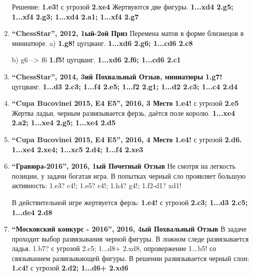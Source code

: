 \begin{enumerate}
Решение: \textbf{1.\rook{}e3!} с угрозой \textbf{2.\rook{}xe4\mate{}} Жертвуются две фигуры. \textbf{1...\rook{}xd4 2.\queen{}g5\mate{}; 1...\king{}xf4 2.\queen{}g3\mate{}; 1...\king{}xd4 2.\queen{}a1\mate{}; 1...\knight{}xf4 2.\queen{}g7\mate{}}
      
\item \textbf{ ``ChessStar'', 2012, 1ый-2ой Приз }  Перемена матов в форме близнецов в миниатюре. a) \textbf{1.\rook{}g8!} цугцванг. \textbf{1...\king{}xd6 2.\rook{}g6\mate{}; 1...cd6 2.\rook{}c8\mate{}}
          
b) \rook{}g6 --> \rook{}f6  \textbf{1.\rook{}f5! }цугцванг. \textbf{1...\king{}xd6 2.\queen{}f6\mate{}; 1...cd6 2.\queen{}c1\mate{}}
      
\item \textbf{ ``ChessStar'', 2014, 3ий Похвальный Отзыв, миниатюры } \textbf{1.\queen{}g7!} цугцванг. \textbf{1...\king{}d3 2.\queen{}c3\mate{}; 1...\king{}f4 2.\queen{}e5\mate{}; 1...\king{}f2 2.\queen{}g1\mate{}; 1...\king{}d2 2.\queen{}c3\mate{}; 1...c4 2.\queen{}d4\mate{}}

\item \textbf{ ``Cupa Bucovinei 2015, E4 E5'', 2016, 3 Место } \textbf{1.\rook{}e4!} с угрозой \textbf{2.\rook{}e5\mate{}} Жертва ладьи, черным развязывается ферзь, даётся поле королю. \textbf{1...\bishop{}xe4 2.\queen{}a2\mate{}; 1...\queen{}xe4 2.\queen{}g5\mate{}; 1...\king{}xe4 2.d5\mate{}}
      
\item \textbf{ ``Cupa Bucovinei 2015, E4 E5'', 2016, 4 Место } \textbf{1.\knight{}e4!} с угрозой \textbf{2.\bishop{}d6\mate{}.  1...\bishop{}xe4 2.\rook{}xe4\mate{}; 1...\bishop{}xc5 2.d4\mate{}; 1...\king{}f4 2.\bishop{}xe3\mate{}}
      
\item \textbf{ ``Гравюра-2016'', 2016, 1ый Почетный Отзыв } Не смотря на легкость позиции, у задачи богатая игра.  В попытках черный сло проявляет большую активность: 1.\rook{}e3? \bishop{}c4!;  1.\knight{}e5? \bishop{}c4!; 1.\knight{}h4? \bishop{}g4!; 1.\knight{}f2-d1? \bishop{}xd1!

В действительной игре жертвуется ферзь: \textbf{1.\knight{}e4!} с угрозой \textbf{2.\queen{}c3\mate{}; 1...\bishop{}d3 2.\queen{}c5\mate{}; 1...de4 2.\rook{}d8\mate{}}

\item \textbf{ ``Московский конкурс - 2016'', 2016, 4ый Похвальный Отзыв}  В задаче проходит выбор развязывания черной фигуры. В ложном следе развязывается ладья. 1.\knight{}b7? с угрозой 2.\knight{}c5\mate{}; 1...\rook{}d8+ 2.\knight{}xd8\mate{}, опровержение 1...\rook{}b5! со связыванием развязывающей фигуры. В решении развязывается черный слон: \textbf{1.\knight{}c4!} с угрозой \textbf{2.\knight{}d2\mate{}; 1...\bishop{}d6+ 2.\knight{}xd6\mate{}}


\end{enumerate}

